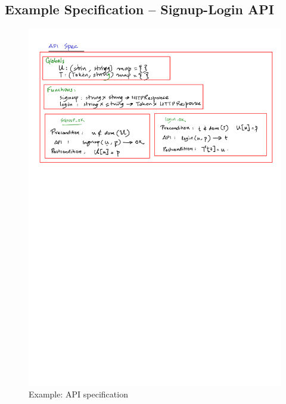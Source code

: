 \documentclass[12pts, a4paper]{article}
\begin{document}
\subsection{Example Specification -- Signup-Login API}
\begin{figure}
\begin{center}
\includegraphics[width=\textwidth]{../images/spec-AST-1.png}
\end{center}
\caption{Example: API specification}
\label{f:spec}
\end{figure}
\end{document}
